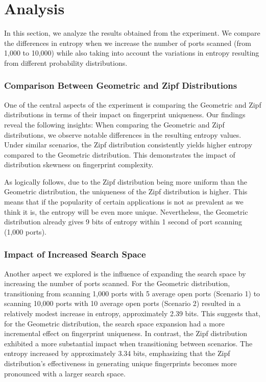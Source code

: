 \section{Analysis}

In this section, we analyze the results obtained from the experiment. We compare the differences in entropy when we increase the number of ports scanned (from 1,000 to 10,000) while also taking into account the variations in entropy resulting from different probability distributions. 

\subsubsection{Comparison Between Geometric and Zipf Distributions}

One of the central aspects of the experiment is comparing the Geometric and Zipf distributions in terms of their impact on fingerprint uniqueness. Our findings reveal the following insights: When comparing the Geometric and Zipf distributions, we observe notable differences in the resulting entropy values. Under similar scenarios, the Zipf distribution consistently yields higher entropy compared to the Geometric distribution. This demonstrates the impact of distribution skewness on fingerprint complexity. 

As logically follows, due to the Zipf distribution being more uniform than the Geometric distribution, the uniqueness of the Zipf distribution is higher. This means that if the popularity of certain applications is not as prevalent as we think it is, the entropy will be even more unique. Nevertheless, the Geometric distribution already gives 9 bits of entropy within 1 second of port scanning (1,000 ports).

\subsubsection{Impact of Increased Search Space}

Another aspect we explored is the influence of expanding the search space by increasing the number of ports scanned.
For the Geometric distribution, transitioning from scanning 1,000 ports with 5 average open ports (Scenario 1) to scanning 10,000 ports with 10 average open ports (Scenario 2) resulted in a relatively modest increase in entropy, approximately 2.39 bits. This suggests that, for the Geometric distribution, the search space expansion had a more incremental effect on fingerprint uniqueness.
In contrast, the Zipf distribution exhibited a more substantial impact when transitioning between scenarios. The entropy increased by approximately 3.34 bits, emphasizing that the Zipf distribution's effectiveness in generating unique fingerprints becomes more pronounced with a larger search space.

